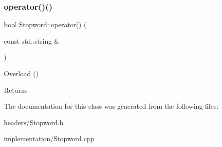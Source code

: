 \subsubsection{\texorpdfstring{operator()()}{operator()()}}
{\footnotesize\ttfamily bool Stopword\+::operator() (\begin{DoxyParamCaption}\item[{const std\+::string \&}]{ }\end{DoxyParamCaption})}

Overload () \begin{DoxyReturn}{Returns}

\end{DoxyReturn}


The documentation for this class was generated from the following files\+:\begin{DoxyCompactItemize}
\item 
headers/Stopword.\+h\item 
implementation/Stopword.\+cpp\end{DoxyCompactItemize}
